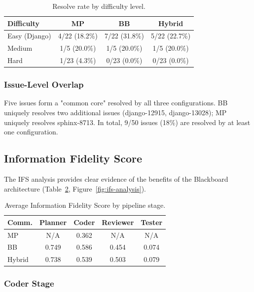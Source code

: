 \documentclass{ieeeaccess}
\begin{document}
\begin{table}[!ht]
\centering
\caption{Resolve rate by difficulty level.}
\label{tab:difficulty}
\begin{tabular}{lccc}
\toprule
\textbf{Difficulty} & \textbf{MP} & \textbf{BB} & \textbf{Hybrid} \\
\midrule
Easy (Django) & 4/22 (18.2\%) & 7/22 (31.8\%) & 5/22 (22.7\%) \\
Medium & 1/5 (20.0\%) & 1/5 (20.0\%) & 1/5 (20.0\%) \\
Hard & 1/23 (4.3\%) & 0/23 (0.0\%) & 0/23 (0.0\%) \\
\bottomrule
\end{tabular}
\end{table}

\subsubsection{Issue-Level Overlap}

Five issues form a "common core" resolved by all three configurations. BB uniquely resolves two additional issues (django-12915, django-13028); MP uniquely resolves sphinx-8713. In total, 9/50 issues (18\%) are resolved by at least one configuration.

\subsection{Information Fidelity Score}
\label{sec:ifs-results}

The IFS analysis provides clear evidence of the benefits of the Blackboard architecture (Table~\ref{tab:ifs}, Figure~\ref{fig:ifs-analysis}).

\begin{table}[!ht]
\centering
\caption{Average Information Fidelity Score by pipeline stage.}
\label{tab:ifs}
\begin{tabular}{lcccc}
\toprule
\textbf{Comm.} & \textbf{Planner} & \textbf{Coder} & \textbf{Reviewer} & \textbf{Tester} \\
\midrule
MP & N/A & 0.362 & N/A & N/A \\
BB & 0.749 & 0.586 & 0.454 & 0.074 \\
Hybrid & 0.738 & 0.539 & 0.503 & 0.079 \\
\bottomrule
\end{tabular}
\end{table}

\subsubsection{Coder Stage}
\end{document}
